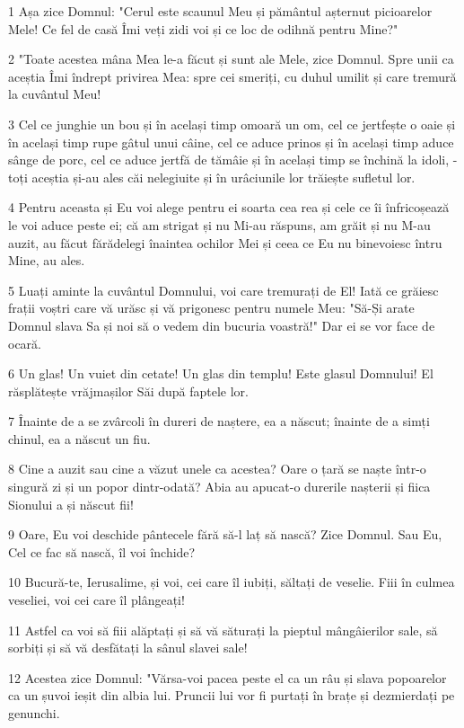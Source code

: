 \par 1 Așa zice Domnul: "Cerul este scaunul Meu și pământul așternut picioarelor Mele! Ce fel de casă Îmi veți zidi voi și ce loc de odihnă pentru Mine?"
\par 2 "Toate acestea mâna Mea le-a făcut și sunt ale Mele, zice Domnul. Spre unii ca aceștia Îmi îndrept privirea Mea: spre cei smeriți, cu duhul umilit și care tremură la cuvântul Meu!
\par 3 Cel ce junghie un bou și în același timp omoară un om, cel ce jertfește o oaie și în același timp rupe gâtul unui câine, cel ce aduce prinos și în același timp aduce sânge de porc, cel ce aduce jertfă de tămâie și în același timp se închină la idoli, - toți aceștia și-au ales căi nelegiuite și în urâciunile lor trăiește sufletul lor.
\par 4 Pentru aceasta și Eu voi alege pentru ei soarta cea rea și cele ce îi înfricoșează le voi aduce peste ei; că am strigat și nu Mi-au răspuns, am grăit și nu M-au auzit, au făcut fărădelegi înaintea ochilor Mei și ceea ce Eu nu binevoiesc întru Mine, au ales.
\par 5 Luați aminte la cuvântul Domnului, voi care tremurați de El! Iată ce grăiesc frații voștri care vă urăsc și vă prigonesc pentru numele Meu: "Să-Și arate Domnul slava Sa și noi să o vedem din bucuria voastră!" Dar ei se vor face de ocară.
\par 6 Un glas! Un vuiet din cetate! Un glas din templu! Este glasul Domnului! El răsplătește vrăjmașilor Săi după faptele lor.
\par 7 Înainte de a se zvârcoli în dureri de naștere, ea a născut; înainte de a simți chinul, ea a născut un fiu.
\par 8 Cine a auzit sau cine a văzut unele ca acestea? Oare o țară se naște într-o singură zi și un popor dintr-odată? Abia au apucat-o durerile nașterii și fiica Sionului a și născut fii!
\par 9 Oare, Eu voi deschide pântecele fără să-l laț să nască? Zice Domnul. Sau Eu, Cel ce fac să nască, îl voi închide?
\par 10 Bucură-te, Ierusalime, și voi, cei care îl iubiți, săltați de veselie. Fiii în culmea veseliei, voi cei care îl plângeați!
\par 11 Astfel ca voi să fiii alăptați și să vă săturați la pieptul mângâierilor sale, să sorbiți și să vă desfătați la sânul slavei sale!
\par 12 Acestea zice Domnul: "Vărsa-voi pacea peste el ca un râu și slava popoarelor ca un șuvoi ieșit din albia lui. Pruncii lui vor fi purtați în brațe și dezmierdați pe genunchi.
